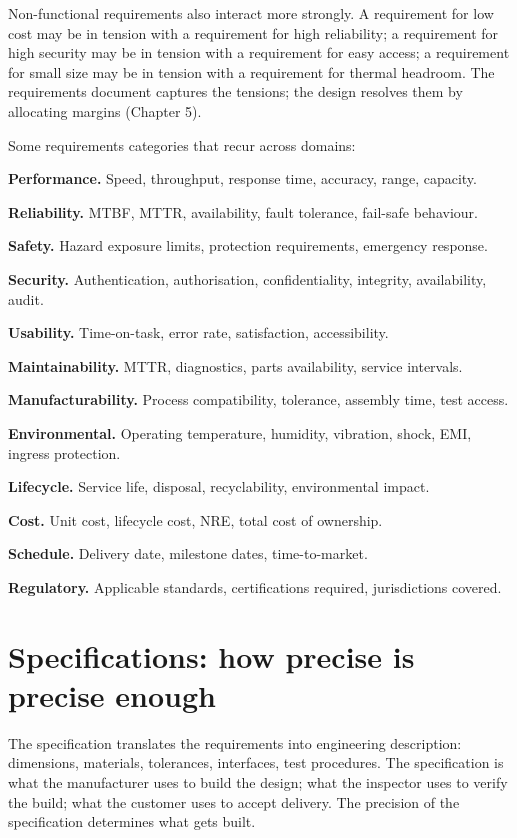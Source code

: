 Non-functional requirements also interact more strongly. A requirement for low cost may be in tension with a requirement for high reliability; a requirement for high security may be in tension with a requirement for easy access; a requirement for small size may be in tension with a requirement for thermal headroom. The requirements document captures the tensions; the design resolves them by allocating margins (Chapter 5).

Some requirements categories that recur across domains:

\textbf{Performance.} Speed, throughput, response time, accuracy, range, capacity.

\textbf{Reliability.} MTBF, MTTR, availability, fault tolerance, fail-safe behaviour.

\textbf{Safety.} Hazard exposure limits, protection requirements, emergency response.

\textbf{Security.} Authentication, authorisation, confidentiality, integrity, availability, audit.

\textbf{Usability.} Time-on-task, error rate, satisfaction, accessibility.

\textbf{Maintainability.} MTTR, diagnostics, parts availability, service intervals.

\textbf{Manufacturability.} Process compatibility, tolerance, assembly time, test access.

\textbf{Environmental.} Operating temperature, humidity, vibration, shock, EMI, ingress protection.

\textbf{Lifecycle.} Service life, disposal, recyclability, environmental impact.

\textbf{Cost.} Unit cost, lifecycle cost, NRE, total cost of ownership.

\textbf{Schedule.} Delivery date, milestone dates, time-to-market.

\textbf{Regulatory.} Applicable standards, certifications required, jurisdictions covered.

\section{Specifications: how precise is precise enough}

The specification translates the requirements into engineering description: dimensions, materials, tolerances, interfaces, test procedures. The specification is what the manufacturer uses to build the design; what the inspector uses to verify the build; what the customer uses to accept delivery. The precision of the specification determines what gets built.


